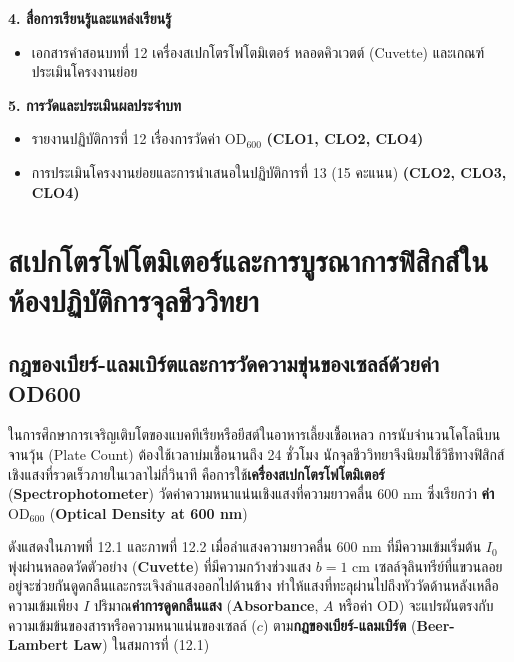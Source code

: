 \begin{planbox}
\noindent\textbf{4. สื่อการเรียนรู้และแหล่งเรียนรู้}
\begin{itemize}
    \item เอกสารคำสอนบทที่ 12 เครื่องสเปกโตรโฟโตมิเตอร์ หลอดคิวเวตต์ (Cuvette) และเกณฑ์ประเมินโครงงานย่อย
\end{itemize}

\noindent\textbf{5. การวัดและประเมินผลประจำบท}
\begin{itemize}
    \item รายงานปฏิบัติการที่ 12 เรื่องการวัดค่า $\text{OD}_{600}$ \textbf{(CLO1, CLO2, CLO4)}
    \item การประเมินโครงงานย่อยและการนำเสนอในปฏิบัติการที่ 13 (15 คะแนน) \textbf{(CLO2, CLO3, CLO4)}
\end{itemize}
\end{planbox}
\clearpage

\chapter{สเปกโตรโฟโตมิเตอร์และการบูรณาการฟิสิกส์ในห้องปฏิบัติการจุลชีววิทยา}

\section{กฎของเบียร์-แลมเบิร์ตและการวัดความขุ่นของเซลล์ด้วยค่า OD600}


ในการศึกษาการเจริญเติบโตของแบคทีเรียหรือยีสต์ในอาหารเลี้ยงเชื้อเหลว การนับจำนวนโคโลนีบนจานวุ้น (Plate Count) ต้องใช้เวลาบ่มเชื้อนานถึง 24 ชั่วโมง นักจุลชีววิทยาจึงนิยมใช้วิธีทางฟิสิกส์เชิงแสงที่รวดเร็วภายในเวลาไม่กี่วินาที คือการใช้\textbf{เครื่องสเปกโตรโฟโตมิเตอร์} (\textbf{Spectrophotometer}) วัดค่าความหนาแน่นเชิงแสงที่ความยาวคลื่น $600\text{ nm}$ ซึ่งเรียกว่า \textbf{ค่า $\text{OD}_{600}$} (\textbf{Optical Density at 600 nm})

ดังแสดงใน\mbox{ภาพที่} 12.1 และ\mbox{ภาพที่} 12.2 เมื่อลำแสงความยาวคลื่น $600\text{ nm}$ ที่มีความเข้มเริ่มต้น $I_0$ พุ่งผ่านหลอดวัดตัวอย่าง (\textbf{Cuvette}) ที่มีความกว้างช่วงแสง $b = 1\text{ cm}$ เซลล์จุลินทรีย์ที่แขวนลอยอยู่จะช่วยกันดูดกลืนและกระเจิงลำแสงออกไปด้านข้าง ทำให้แสงที่ทะลุผ่านไปถึงหัววัดด้านหลังเหลือความเข้มเพียง $I$ ปริมาณ\textbf{ค่าการดูดกลืนแสง} (\textbf{Absorbance}, $A$ หรือค่า $\text{OD}$) จะแปรผันตรงกับความเข้มข้นของสารหรือความหนาแน่นของเซลล์ ($c$) ตาม\textbf{กฎของเบียร์-แลมเบิร์ต} (\textbf{Beer-Lambert Law}) ในสมการที่ (12.1)

